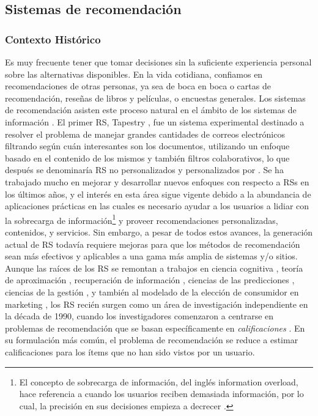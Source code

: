 \subsection{Sistemas de recomendación}
\subsubsection{Contexto Histórico}
Es muy frecuente tener que tomar decisiones sin la suficiente experiencia personal sobre las alternativas disponibles. En la vida cotidiana, confiamos en recomendaciones de otras personas, ya sea de boca en boca o cartas de recomendación, reseñas de libros y películas, o encuestas generales. Los sistemas de recomendación asisten este proceso natural en el ámbito de los sistemas de información \citep{resnick1997recommender}. El primer RS, Tapestry \citep{goldberg1992using}, fue un sistema experimental destinado a resolver el problema de manejar grandes cantidades de correos electrónicos filtrando según cuán interesantes son los documentos, utilizando un enfoque basado en el contenido de los mismos y también filtros colaborativos, lo que después se denominaría RS no personalizados y personalizados por \cite{ricci2011introduction}. Se ha trabajado mucho en mejorar y desarrollar nuevos enfoques con respecto a RSs en los últimos años, y el interés en esta área sigue vigente debido a la abundancia de aplicaciones prácticas en las cuales es necesario ayudar a los usuarios a lidiar con la sobrecarga de información\footnote{El concepto de sobrecarga de información, del inglés information overload, hace referencia a cuando los usuarios reciben demasiada información, por lo cual, la precisión en sus decisiones empieza a decrecer \citep{eppler2004concept}.} y proveer recomendaciones personalizadas, contenidos, y servicios. Sin embargo, a pesar de todos estos avances, la generación actual de RS todavía requiere mejoras para que los métodos de recomendación sean más efectivos y aplicables a una gama más amplia de sistemas y/o sitios. Aunque las raíces de los RS se remontan a trabajos en ciencia cognitiva \citep{rich1979user}, teoría de aproximación \citep{powell1981approximation}, recuperación de información \citep{salton1989automatic}, ciencias de las predicciones \citep{armstrong2001principles}, ciencias de la gestión \citep{murthi2003role}, y también al modelado de la elección de consumidor en marketing \citep{lilien1992marketing}, los RS recién surgen como un área de investigación independiente en la década de 1990, cuando los investigadores comenzaron a centrarse en problemas de recomendación que se basan específicamente en \textit{calificaciones} \citep{adomavicius2005toward}. En su formulación más común, el problema de recomendación se reduce a estimar calificaciones para los ítems que no han sido vistos por un usuario.

